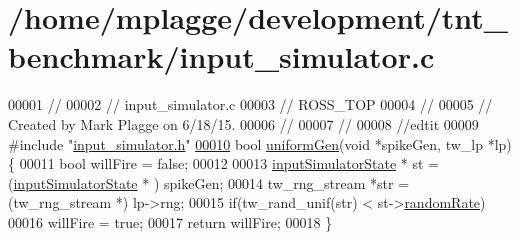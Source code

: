 \hypertarget{input__simulator_8c_source}{}\section{/home/mplagge/development/tnt\+\_\+benchmark/input\+\_\+simulator.c}

\begin{DoxyCode}
00001 \textcolor{comment}{//}
00002 \textcolor{comment}{//  input\_simulator.c}
00003 \textcolor{comment}{//  ROSS\_TOP}
00004 \textcolor{comment}{//}
00005 \textcolor{comment}{//  Created by Mark Plagge on 6/18/15.}
00006 \textcolor{comment}{//}
00007 \textcolor{comment}{//}
00008 \textcolor{comment}{//edtit}
00009 \textcolor{preprocessor}{#include "\hyperlink{input__simulator_8h}{input\_simulator.h}"}
\hypertarget{input__simulator_8c_source_l00010}{}\hyperlink{input__simulator_8h_ad6244e86a3542f8d3c64766e7e7c6746}{00010} \textcolor{keywordtype}{bool} \hyperlink{input__simulator_8c_a7ffa6df128d9c249ace6677ae62d1723}{uniformGen}(\textcolor{keywordtype}{void} *spikeGen, tw\_lp *lp) \{
00011     \textcolor{keywordtype}{bool} willFire = \textcolor{keyword}{false};
00012 
00013     \hyperlink{structinput_simulator_state}{inputSimulatorState} * st = (\hyperlink{structinput_simulator_state}{inputSimulatorState} * ) spikeGen;
00014     tw\_rng\_stream *str = (tw\_rng\_stream *) lp->rng;
00015     \textcolor{keywordflow}{if}(tw\_rand\_unif(str) < st->\hyperlink{structinput_simulator_state_a1333eb5695ae83d1ffccf24b08bc6288}{randomRate})
00016         willFire = \textcolor{keyword}{true};
00017     \textcolor{keywordflow}{return} willFire;
00018 \}
\end{DoxyCode}
